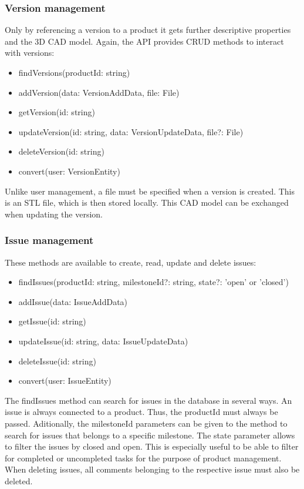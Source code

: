     \subsubsection*{Version management}
    Only by referencing a version to a product it gets further descriptive properties and the 3D CAD model. Again, the API provides CRUD methods to interact with versions:

    \begin{itemize}
        \item findVersions(productId: string)
        \item addVersion(data: VersionAddData, file: File)
        \item getVersion(id: string)
        \item updateVersion(id: string, data: VersionUpdateData, file?: File)
        \item deleteVersion(id: string)
        \item convert(user: VersionEntity)
    \end{itemize}

    Unlike user management, a file must be specified when a version is created. This is an STL file, which is then stored locally. This CAD model can be exchanged when updating the version.

    \subsubsection*{Issue management} 
    These methods are available to create, read, update and delete issues:
    \begin{itemize}
        \item findIssues(productId: string, milestoneId?: string, state?: 'open' or 'closed')
        \item addIssue(data: IssueAddData)
        \item getIssue(id: string)
        \item updateIssue(id: string, data: IssueUpdateData)
        \item deleteIssue(id: string)
        \item convert(user: IssueEntity)
    \end{itemize}

    The findIssues method can search for issues in the database in several ways. An issue is always connected to a product. Thus, the productId must always be passed. Aditionally, the milestoneId parameters can be given to the method to search for issues that belongs to a specific milestone. The state parameter allows to filter the issues by closed and open. This is especially useful to be able to filter for completed or uncompleted tasks for  the purpose of product management. When deleting issues, all comments belonging to the respective issue must also be deleted.

